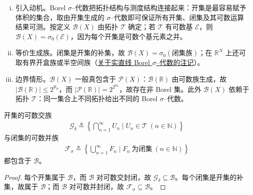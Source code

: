 \documentclass[../../main.tex]{subfiles}%
\begin{document}
\begin{remark}\label{remark:ch01-Borel代数}
\begin{enumerate}[(i)]
\item 引入动机。Borel $\sigma$--代数把拓扑结构与测度结构连接起来：开集是最容易赋予体积的集合，取由开集生成的 $\sigma$--代数即可保证所有开集、闭集及其可数运算结果可测。按定义 $\mathcal{B}(X)$ 由拓扑 $\mathcal{T}$ 确定；若 $\mathcal{T}$ 有可数基 $\mathcal{E}$，则 $\mathcal{B}(X)=\sigma_0(\mathcal{E})$，因为每个开集是可数个基元素之并。
\item 等价生成族。闭集是开集的补集，故 $\mathcal{B}(X)=\sigma_0(\text{闭集族})$；在 $\mathbb{R}^N$ 上还可取有界开盒族或半空间族（\hyperref[remark:ch01-实直线Borel]{关于实直线 Borel $\sigma$--代数的注记}）。
\item 边界情形。$\mathcal{B}(X)$ 一般真包含于 $\mathcal{P}(X)$：$\mathcal{B}(\mathbb{R})$ 由可数族生成，故 $\lvert\mathcal{B}(\mathbb{R})\rvert\leqslant2^{\aleph_0}$，而 $\lvert\mathcal{P}(\mathbb{R})\rvert=2^{2^{\aleph_0}}$，故存在非 Borel 集。此外 $\mathcal{B}(X)$ 依赖于拓扑 $\mathcal{T}$：同一集合上不同拓扑给出不同的 Borel $\sigma$--代数。
\end{enumerate}
\end{remark}

\begin{example}\label{example:ch01-GdeltaFsigma}
开集的可数交族
\begin{align*}
\mathcal{G}_\delta\triangleq\left\{\bigcap_{n=1}^\infty U_n\mid U_n\in\mathcal{T}\ (n\in\mathbb{N})\right\}
\end{align*}
与闭集的可数并族
\begin{align*}
\mathcal{F}_\sigma\triangleq\left\{\bigcup_{n=1}^\infty F_n\mid F_n\ \text{为闭集}\ (n\in\mathbb{N})\right\}
\end{align*}
都包含于 $\mathcal{B}$。
\end{example}

\begin{proof}
每个开集属于 $\mathcal{B}$，而 $\mathcal{B}$ 对可数交封闭，故 $\mathcal{G}_\delta\subseteq\mathcal{B}$。每个闭集是开集的补集，故属于 $\mathcal{B}$；而 $\mathcal{B}$ 对可数并封闭，故 $\mathcal{F}_\sigma\subseteq\mathcal{B}$。
\end{proof}
\end{document}
